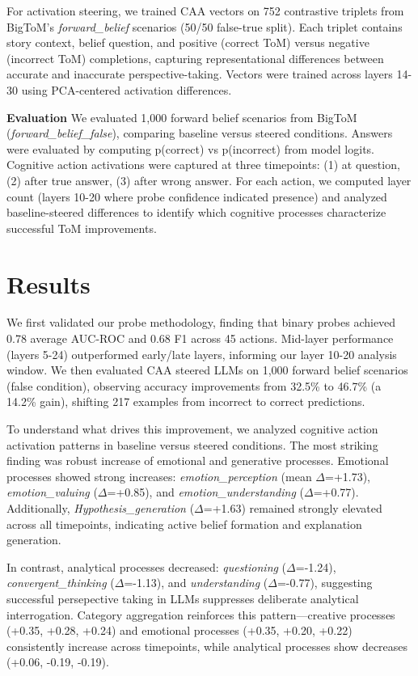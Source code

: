 \documentclass[letterpaper]{article}
\begin{document}
For activation steering, we trained CAA vectors \cite{rimsky2023steering,zou2023representation} on 752 contrastive triplets from BigToM's \cite{gandhi2023understanding} \textit{forward\_belief} scenarios (50/50 false-true split). Each triplet contains story context, belief question, and positive (correct ToM) versus negative (incorrect ToM) completions, capturing representational differences between accurate and inaccurate perspective-taking. Vectors were trained across layers 14-30 using PCA-centered activation differences.

\textbf{Evaluation} We evaluated 1,000 forward belief scenarios from BigToM \cite{gandhi2023understanding} (\textit{forward\_belief\_false}), comparing baseline versus steered conditions. Answers were evaluated by computing p(correct) vs p(incorrect) from model logits. Cognitive action activations were captured at three timepoints: (1) at question, (2) after true answer, (3) after wrong answer. For each action, we computed layer count (layers 10-20 where probe confidence indicated presence) and analyzed baseline-steered differences to identify which cognitive processes characterize successful ToM improvements.

\section{Results}

We first validated our probe methodology, finding that binary probes achieved 0.78 average AUC-ROC and 0.68 F1 across 45 actions. Mid-layer performance (layers 5-24) outperformed early/late layers, informing our layer 10-20 analysis window. We then evaluated CAA steered LLMs on 1,000 forward belief scenarios (false condition), observing accuracy improvements from 32.5\% to 46.7\% (a 14.2\% gain), shifting 217 examples from incorrect to correct predictions.

To understand what drives this improvement, we analyzed cognitive action activation patterns in baseline versus steered conditions. The most striking finding was robust increase of emotional and generative processes. Emotional processes showed strong increases: \textit{emotion\_perception} (mean $\Delta$=+1.73), \textit{emotion\_valuing} ($\Delta$=+0.85), and \textit{emotion\_understanding} ($\Delta$=+0.77). Additionally, \textit{Hypothesis\_generation} ($\Delta$=+1.63) remained strongly elevated across all timepoints, indicating active belief formation and explanation generation.

In contrast, analytical processes decreased: \textit{questioning} ($\Delta$=-1.24), \textit{convergent\_thinking} ($\Delta$=-1.13), and \textit{understanding} ($\Delta$=-0.77), suggesting successful persepective taking in LLMs suppresses deliberate analytical interrogation. Category aggregation reinforces this pattern—creative processes (+0.35, +0.28, +0.24) and emotional processes (+0.35, +0.20, +0.22) consistently increase across timepoints, while analytical processes show decreases (+0.06, -0.19, -0.19).
\end{document}
